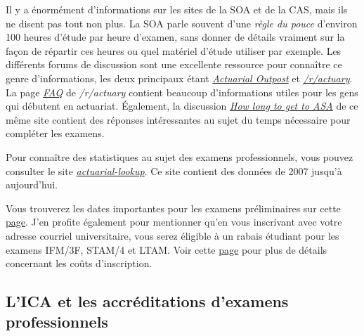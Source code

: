 Il y a énormément d'informations sur les sites de la SOA et de la CAS, mais ils ne disent pas tout non plus. La SOA parle souvent  d'une \emph{règle du pouce} d'environ 100 heures d'étude par heure d'examen, sans donner de détails vraiment sur la façon de répartir ces heures ou quel matériel d'étude utiliser par exemple. Les différents forums de discussion sont une excellente ressource pour connaître ce genre d'informations, les deux principaux étant \href{http://www.actuarialoutpost.com/}{\emph{Actuarial Outpost}} et \href{https://www.reddit.com/r/actuary}{\emph{/r/actuary}}. La page \href{https://www.reddit.com/r/actuary/wiki/index#wiki_the_frequently_asked_questions_.28faqs.29}{\emph{FAQ}} de \emph{/r/actuary} contient beaucoup d'informations utiles pour les gens qui débutent en actuariat. Également, la discussion \href{https://www.reddit.com/r/actuary/comments/1enzdd/how_long_to_get_to_asa_is_two_years_possible/}{\emph{How long to get to ASA}} de ce même site contient des réponses intéressantes au sujet du temps nécessaire pour compléter les examens. \vspace{\baselineskip}

Pour connaître des statistiques au sujet des examens professionnels, vous pouvez consulter le site \href{http://actuarial-lookup.com/}{\emph{actuarial-lookup}}. Ce site contient des données de 2007 jusqu'à aujourd'hui. \vspace{\baselineskip}

Vous trouverez les dates importantes pour les examens préliminaires sur cette \href{https://www.soa.org/Education/Exam-Req/Exam-Day-Info/edu-2018-cbt-test-schedule.aspx}{page}. J'en profite également pour mentionner qu'en vous inscrivant avec votre adresse courriel universitaire, vous serez éligible à un rabais étudiant pour les examens IFM/3F, STAM/4 et LTAM. Voir cette \href{https://soa.org/Education/Exam-Req/Syllabus-Study-Materials/Exam-and-Module-Fees.aspx}{page} pour plus de détails concernant les coûts d'inscription. \vspace{\baselineskip}

\newpage

\subsection*{L'ICA et les accréditations d'examens professionnels}
\label{subsec:ica}

